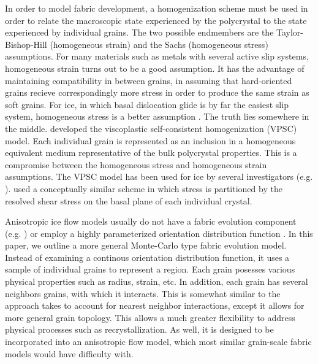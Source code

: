 \documentclass{article}
\begin{document}
In order to model fabric development, a homogenization scheme must be used in order to relate the macroscopic state experienced by the polycrystal to the state experienced by individual grains. The two possible endmembers are the Taylor-Bishop-Hill (homogeneous strain) \citep{taylor} and the Sachs (homogeneous stress) \citep{sachs} assumptions. For many materials such as metals with several active slip systems, homogeneous strain turns out to be a good assumption. It has the advantage of maintaining compatibility in between grains, in assuming that hard-oriented grains recieve correspondingly more stress in order to produce the same strain as soft grains. For ice, in which basal dislocation glide is by far the easiest slip system, homogeneous stress is a better assumption \citep{thorsteinsson2002nni}. The truth lies somewhere in the middle. \citet{molinari} developed the viscoplastic self-consistent homogenization (VPSC) model. Each individual grain is represented as an inclusion in a homogeneous equivalent medium representative of the bulk polycrystal properties. This is a compromise between the homogeneous stress and homogeneous strain assumptions. The VPSC model has been used for ice by several investigators (e.g. \citet{gillet2005}). \citet{azuma96} used a conceptually similar scheme in which stress is partitioned by the resolved shear stress on the basal plane of each individual crystal. 

Anisotropic ice flow models usually do not have a fabric evolution component (e.g. \citet{pettit2007}) or employ a highly parameterized orientation distribution function \citep{gillet2006}. In this paper, we outline a more general Monte-Carlo type fabric evolution model. Instead of examining a continous orientation distribution function, it uses a sample of individual grains to represent a region. Each grain posesses various physical properties such as radius, strain, etc. In addition, each grain has several neighbors grains, with which it interacts. This is somewhat similar to the approach \citet{thorsteinnson2002nni} takes to account for nearest neighbor interactions, except it allows for more general grain topology.
This allows a much greater flexibility to address physical processes such as recrystallization. As well, it is designed to be incorporated into an anisotropic flow model, which most similar grain-scale fabric models would have difficulty with. 
\end{document}
